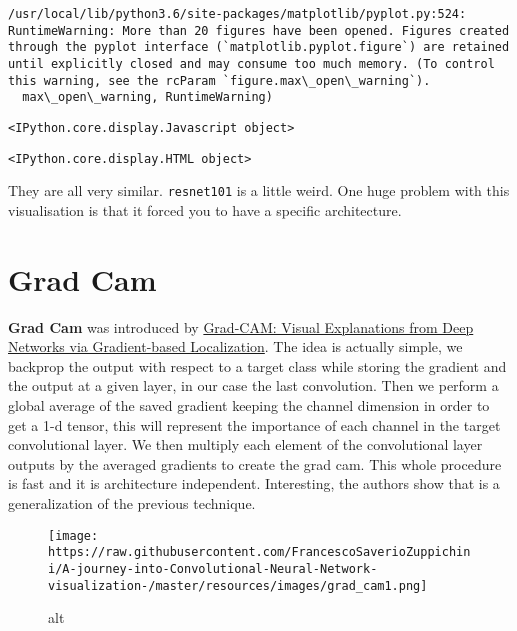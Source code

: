 \documentclass[11pt]{article}
\makeatletter
\def\maxwidth{\ifdim\Gin@nat@width>\linewidth\linewidth
    \else\Gin@nat@width\fi}
\let\Oldincludegraphics\includegraphics
\renewcommand{\includegraphics}[1]{\Oldincludegraphics[width=.8\maxwidth]{#1}}
\makeatother
\begin{document}
    \begin{Verbatim}[commandchars=\\\{\}]
/usr/local/lib/python3.6/site-packages/matplotlib/pyplot.py:524: RuntimeWarning: More than 20 figures have been opened. Figures created through the pyplot interface (`matplotlib.pyplot.figure`) are retained until explicitly closed and may consume too much memory. (To control this warning, see the rcParam `figure.max\_open\_warning`).
  max\_open\_warning, RuntimeWarning)

    \end{Verbatim}

    
    \begin{verbatim}
<IPython.core.display.Javascript object>
    \end{verbatim}

    
    
    \begin{verbatim}
<IPython.core.display.HTML object>
    \end{verbatim}

    
    They are all very similar. \texttt{resnet101} is a little weird. One
huge problem with this visualisation is that it forced you to have a
specific architecture.

    \section{Grad Cam}\label{grad-cam}

    \textbf{Grad Cam} was introduced by
\href{https://arxiv.org/abs/1610.02391}{Grad-CAM: Visual Explanations
from Deep Networks via Gradient-based Localization}. The idea is
actually simple, we backprop the output with respect to a target class
while storing the gradient and the output at a given layer, in our case
the last convolution. Then we perform a global average of the saved
gradient keeping the channel dimension in order to get a 1-d tensor,
this will represent the importance of each channel in the target
convolutional layer. We then multiply each element of the convolutional
layer outputs by the averaged gradients to create the grad cam. This
whole procedure is fast and it is architecture independent. Interesting,
the authors show that is a generalization of the previous technique.

\begin{figure}
\centering
\texttt{[image: https://raw.githubusercontent.com/FrancescoSaverioZuppichini/A-journey-into-Convolutional-Neural-Network-visualization-/master/resources/images/grad\_cam1.png]}
\caption{alt}
\end{figure}
\end{document}
